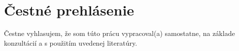 \thispagestyle{empty}


\section*{Čestné prehlásenie}

\vspace*{\fill}

Čestne vyhlasujem, že som túto prácu vypracoval(a) samostatne, na základe konzultácií
a s použitím uvedenej literatúry.

\FIITsignPlaceSK \FIITsignDate
\hspace*{\fill} \signaturespace{5cm}{\FIITauthor}
